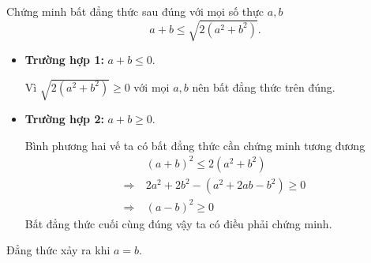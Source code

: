 \begin{problem}
	Chứng minh bất đẳng thức sau đúng với mọi số thực $a, b$
	\[
		a + b \le \sqrt{2(a^2 + b^2)}.
	\]
	\solution
	\begin{itemize}
		\item \textbf{Trường hợp 1:} $a + b \le 0$.

		Vì $\sqrt{2(a^2 + b^2)} \ge 0$ với mọi $a, b$ nên bất đẳng thức trên đúng.
		\item \textbf{Trường hợp 2:} $a + b \ge 0$.

		Bình phương hai vế ta có bất đẳng thức cần chứng minh tương đương
		\begin{align*}
			&(a + b)^2 \le 2(a^2 + b^2) \\ 
			\Rightarrow \ &2a^2 + 2b^2 - (a^2 + 2ab - b^2) \ge 0 \\ 
			\Rightarrow \ &(a - b)^2 \ge 0
		\end{align*}
		Bất đẳng thức cuối cùng đúng vậy ta có điều phải chứng minh.
	\end{itemize}
	Đẳng thức xảy ra khi $a = b$.
\end{problem}